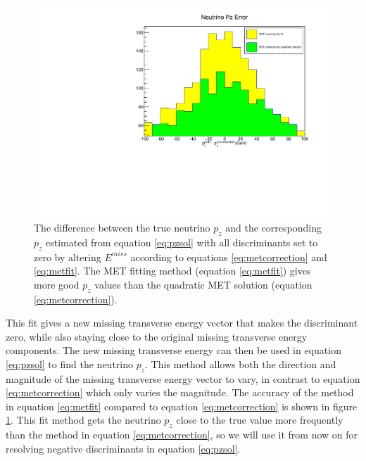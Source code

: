 \documentclass[10pt]{ucscthesisbs}
\begin{document}
\begin{figure}
\includegraphics[height=8cm]{images/PzErrorMETCorrection}
\caption{The difference between the true neutrino $p_z$ and the corresponding $p_z$ estimated from equation \ref{eq:pzsol} with all discriminants set to zero by altering $E^{miss}$ according to equations \ref{eq:metcorrection} and \ref{eq:metfit}. The MET fitting method (equation \ref{eq:metfit}) gives more good $p_z$ values than the quadratic MET solution (equation \ref{eq:metcorrection}).}
\label{figure:pzerrormetcorrection}
\end{figure}
This fit gives a new missing transverse energy vector that makes the discriminant zero, while also staying close to the original missing transverse energy components. The new missing transverse energy can then be used in equation \ref{eq:pzsol} to find the neutrino $p_z$. This method allows both the direction and magnitude of the missing transverse energy vector to vary, in contrast to equation \ref{eq:metcorrection} which only varies the magnitude. The accuracy of the method in equation \ref{eq:metfit} compared to equation \ref{eq:metcorrection} is shown in figure \ref{figure:pzerrormetcorrection}. This fit method gets the neutrino $p_z$ close to the true value more frequently than the method in equation \ref{eq:metcorrection}, so we will use it from now on for resolving negative discriminants in equation \ref{eq:pzsol}. 
\end{document}
